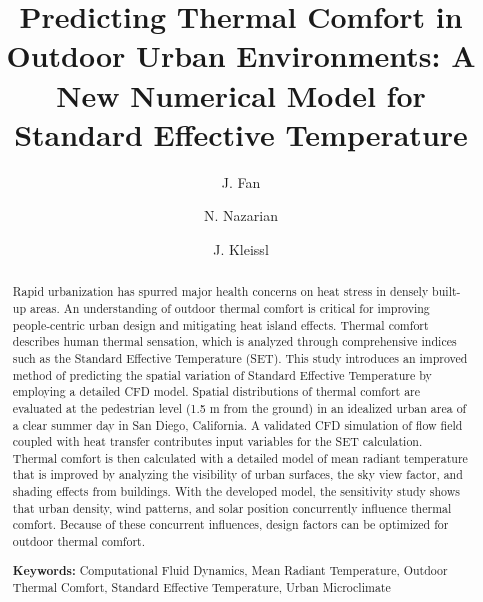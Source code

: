 \documentclass[preprint,3p,12pt,english]{elsarticle}
\begin{document}
\footskip=0.5in %
\begin{frontmatter}

\title{Predicting Thermal Comfort in Outdoor Urban Environments: A New Numerical Model for Standard Effective Temperature}

\author[rvt]{J. Fan }
\author[rvt]{N. Nazarian}
\author[rvt]{J. Kleissl}

\address[rvt]{Mechanical and Aerospace Engineering, University of California, San Diego, 9500 Gilman Dr. 0411, La Jolla, CA 92093-0411}



\begin{abstract}
Rapid urbanization has spurred major health concerns on heat stress in densely built-up areas. An understanding of outdoor thermal comfort is critical for improving people-centric urban design and mitigating heat island effects. Thermal comfort describes human thermal sensation, which is analyzed through comprehensive indices such as the Standard Effective Temperature (SET). This study introduces an improved method of predicting the spatial variation of Standard Effective Temperature by employing a detailed CFD model. Spatial distributions of thermal comfort are evaluated at the pedestrian level (1.5 m from the ground) in an idealized urban area of a clear summer day in San Diego, California. A validated CFD simulation of flow field coupled with heat transfer contributes input variables for the SET calculation. Thermal comfort is then calculated with a detailed model of mean radiant temperature that is improved by analyzing the visibility of urban surfaces, the sky view factor, and shading effects from buildings. With the developed model, the sensitivity study shows that urban density, wind patterns, and solar position concurrently influence thermal comfort. Because of these concurrent influences, design factors can be optimized for outdoor thermal comfort. 


\textbf{Keywords:} Computational Fluid Dynamics, Mean Radiant Temperature, Outdoor Thermal Comfort, Standard Effective Temperature, Urban Microclimate 

\end{abstract}
\end{frontmatter}
\end{document}
